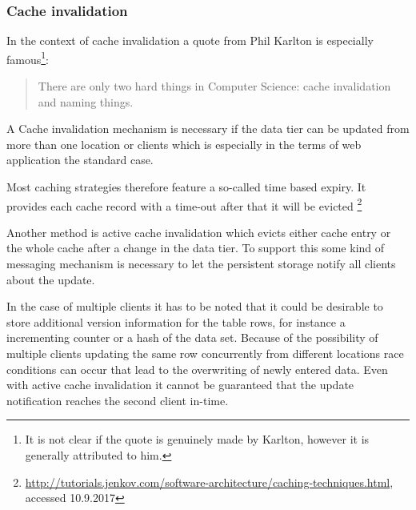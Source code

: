 \subsubsection{Cache invalidation}
In the context of cache invalidation a quote from Phil Karlton is especially famous\footnote{It is not clear if the quote is genuinely made by Karlton, however it is generally attributed to him.}: 
\begin{quote}
There are only two hard things in Computer Science: cache invalidation and naming things.
\end{quote}

A Cache invalidation mechanism is necessary if the data tier can be updated from more than one location or clients which is especially in the terms of web application the standard case. 

Most caching strategies therefore feature a so-called time based expiry. It provides each cache record with a time-out after that it will be evicted \footnote{\href{http://tutorials.jenkov.com/software-architecture/caching-techniques.html}{http://tutorials.jenkov.com/software-architecture/caching-techniques.html}, accessed 10.9.2017}

Another method is active cache invalidation which evicts either cache entry or the whole cache after a change in the data tier. To support this some kind of messaging mechanism is necessary to let the persistent storage notify all clients about the update. 

In the case of multiple clients it has to be noted that it could be desirable to store additional version information for the table rows, for instance a incrementing counter or a hash of the data set. Because of the possibility of multiple clients updating the same row concurrently from different locations race conditions can occur that lead to the overwriting of newly entered data. Even with active cache invalidation it cannot be guaranteed that the update notification reaches the second client in-time. 